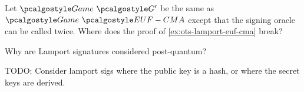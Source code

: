 \begin{exercise}
  Let $\Game~\algo{G'}$ be the same as $\Game~\algo{EUF-CMA}$ except that the signing oracle can be called twice. Where does the proof of \autoref{ex:ots-lamport-euf-cma} break?
\end{exercise}

\begin{exercise}[Optional]
  Why are Lamport signatures considered post-quantum?
\end{exercise}

\begin{exercise}
  TODO: Consider lamport sigs where the public key is a hash, or where the secret keys are derived.
\end{exercise}

